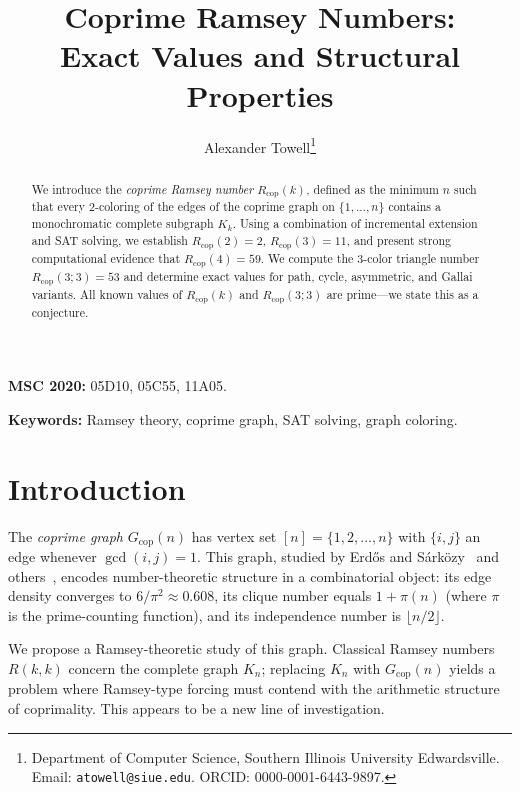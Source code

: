 \documentclass[11pt]{article}
\theoremstyle{plain}
\theoremstyle{definition}
\newcommand{\Rcop}{R_{\mathrm{cop}}}
\newcommand{\Gcop}{G_{\mathrm{cop}}}
\begin{document}
\title{Coprime Ramsey Numbers:\\
Exact Values and Structural Properties}

\author{Alexander Towell\thanks{Department of Computer Science,
Southern Illinois University Edwardsville.
Email: \texttt{atowell@siue.edu}.
ORCID: 0000-0001-6443-9897.}}

\date{}
\maketitle

\begin{abstract}
We introduce the \emph{coprime Ramsey number} $\Rcop(k)$, defined as
the minimum $n$ such that every $2$-coloring of the edges of the coprime
graph on $\{1,\ldots,n\}$ contains a monochromatic complete subgraph
$K_k$. Using a combination of incremental extension and SAT solving, we
establish $\Rcop(2)=2$, $\Rcop(3)=11$, and present strong computational
evidence that $\Rcop(4)=59$. We compute the $3$-color triangle number
$\Rcop(3;3)=53$ and determine exact values for path, cycle, asymmetric,
and Gallai variants. All known values of $\Rcop(k)$ and $\Rcop(3;3)$
are prime---we state this as a conjecture.
\end{abstract}

\smallskip\noindent\textbf{MSC 2020:} 05D10, 05C55, 11A05.

\smallskip\noindent\textbf{Keywords:} Ramsey theory, coprime graph,
SAT solving, graph coloring.

\section{Introduction}\label{sec:intro}

The \emph{coprime graph} $\Gcop(n)$ has vertex set
$[n]=\{1,2,\ldots,n\}$ with $\{i,j\}$ an edge whenever
$\gcd(i,j)=1$. This graph, studied by Erd\H{o}s and
S\'ark\"ozy~\cite{erdos1997coprime} and others~\cite{pomerance2015,
ahlswede1993}, encodes number-theoretic structure in a combinatorial
object: its edge density converges to $6/\pi^2\approx 0.608$, its
clique number equals $1+\pi(n)$ (where $\pi$ is the prime-counting
function), and its independence number is $\lfloor n/2\rfloor$.

We propose a Ramsey-theoretic study of this graph. Classical Ramsey
numbers $R(k,k)$ concern the complete graph $K_n$; replacing $K_n$ with
$\Gcop(n)$ yields a problem where Ramsey-type forcing must contend with
the arithmetic structure of coprimality. This appears to be a new line
of investigation.
\end{document}
